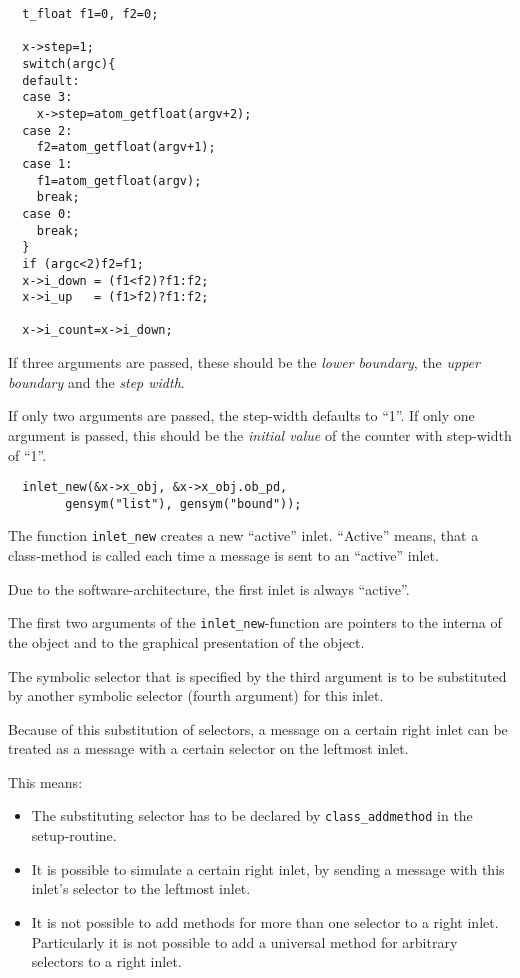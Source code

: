 \documentclass[12pt, a4paper,english,titlepage]{article}
\begin{document}
\begin{verbatim}
  t_float f1=0, f2=0;

  x->step=1;
  switch(argc){
  default:
  case 3:
    x->step=atom_getfloat(argv+2);
  case 2:
    f2=atom_getfloat(argv+1);
  case 1:
    f1=atom_getfloat(argv);
    break;
  case 0:
    break;
  }
  if (argc<2)f2=f1;
  x->i_down = (f1<f2)?f1:f2;
  x->i_up   = (f1>f2)?f1:f2;

  x->i_count=x->i_down;
\end{verbatim}

If three arguments are passed, these should be the {\em lower boundary},
the {\em upper boundary} and the {\em step width}.

If only two arguments are passed, the step-width defaults to ``1''.
If only one argument is passed, this should be the {\em initial value} of the counter with
step-width of ``1''.

\begin{verbatim}
  inlet_new(&x->x_obj, &x->x_obj.ob_pd,
        gensym("list"), gensym("bound"));
\end{verbatim}

The function \verb+inlet_new+ creates a new ``active'' inlet.
``Active'' means, that a class-method is called each time
a message is sent to an ``active'' inlet.

Due to the software-architecture, the first inlet is always ``active''.

The first two arguments of the \verb+inlet_new+-function are
pointers to the interna of the object and to the graphical presentation of the object.

The symbolic selector that is specified by the third argument is to be
substituted by another symbolic selector (fourth argument) for this inlet.

Because of this substitution of selectors,
a message on a certain right inlet can be treated as a message with 
a certain selector on the leftmost inlet.

This means:
\begin{itemize}
\item The substituting selector has to be declared by \verb+class_addmethod+
in the setup-routine.
\item It is possible to simulate a certain right inlet, by sending a message with
this inlet's selector to the leftmost inlet.
\item It is not possible to add methods for more than one selector to a right inlet.
Particularly it is not possible to add a universal method for arbitrary selectors to 
a right inlet.
\end{itemize}
\end{document}
